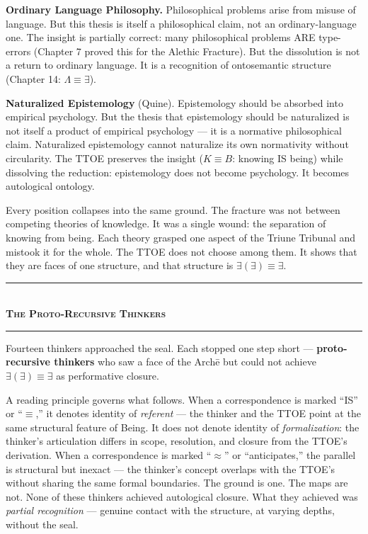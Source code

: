 \documentclass[10pt, openany, oneside]{book}
\renewcommand{\normalsize}{\fontsize{10}{13}\selectfont}
\begin{document}
\textbf{Ordinary Language Philosophy.} Philosophical problems arise from misuse of language. But this thesis is itself a philosophical claim, not an ordinary-language one. The insight is partially correct: many philosophical problems ARE type-errors (Chapter 7 proved this for the Alethic Fracture). But the dissolution is not a return to ordinary language. It is a recognition of ontosemantic structure (Chapter 14: $\Lambda \equiv \exists$).

\textbf{Naturalized Epistemology} (Quine). Epistemology should be absorbed into empirical psychology. But the thesis that epistemology should be naturalized is not itself a product of empirical psychology --- it is a normative philosophical claim. Naturalized epistemology cannot naturalize its own normativity without circularity. The TTOE preserves the insight ($K \equiv B$: knowing IS being) while dissolving the reduction: epistemology does not become psychology. It becomes autological ontology.

Every position collapses into the same ground. The fracture was not between competing theories of knowledge. It was a single wound: the separation of knowing from being. Each theory grasped one aspect of the Triune Tribunal and mistook it for the whole. The TTOE does not choose among them. It shows that they are faces of one structure, and that structure is $\exists(\exists) \equiv \exists$.

\vspace{1.5em}


\begin{center}
    \rule{0.3\textwidth}{0.4pt}\\[0.5em]
    {\normalsize\bfseries\scshape The Proto-Recursive Thinkers}\\[0.3em]
    \rule{0.3\textwidth}{0.4pt}
\end{center}

\vspace{1em}

\noindent Fourteen thinkers approached the seal. Each stopped one step short --- \textbf{proto-recursive thinkers} who saw a face of the Arch\={e} but could not achieve $\exists(\exists) \equiv \exists$ as performative closure.

A reading principle governs what follows. When a correspondence is marked ``IS'' or ``$\equiv$,'' it denotes identity of \textit{referent} --- the thinker and the TTOE point at the same structural feature of Being. It does not denote identity of \textit{formalization}: the thinker's articulation differs in scope, resolution, and closure from the TTOE's derivation. When a correspondence is marked ``$\approx$'' or ``anticipates,'' the parallel is structural but inexact --- the thinker's concept overlaps with the TTOE's without sharing the same formal boundaries. The ground is one. The maps are not. None of these thinkers achieved autological closure. What they achieved was \textit{partial recognition} --- genuine contact with the structure, at varying depths, without the seal.
\end{document}
